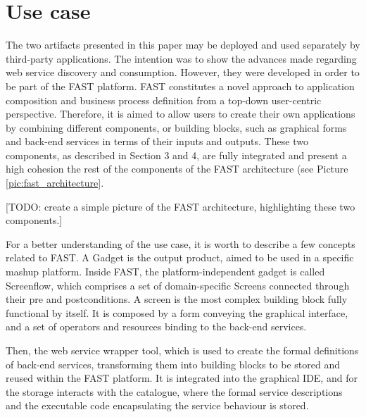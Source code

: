
\section{Use case}
\label{sec:use_case}

The two artifacts presented in this paper may be deployed and used separately by third-party applications. The intention was to show the advances made regarding web service discovery and consumption. However, they were developed in order to be part of the FAST platform. FAST constitutes a novel approach to application composition and business process definition from a top-down user-centric perspective. Therefore, it is aimed to allow users to create their own applications by combining different components, or building blocks, such as graphical forms and back-end services in terms of their inputs and outputs. These two components, as described in Section 3 and 4, are fully integrated and present a high cohesion the rest of the components of the FAST architecture (see Picture \ref{pic:fast_architecture}. 

[TODO: create a simple picture of the FAST architecture, highlighting these two components.]

For a better understanding of the use case, it is worth to describe a few concepts related to FAST. A Gadget is the output product, aimed to be used in a specific mashup platform. Inside FAST, the platform-independent gadget is called Screenflow, which comprises a set of domain-specific Screens connected through their pre and postconditions. A screen is the most complex building block fully functional by itself. It is composed by a form conveying the graphical interface, and a set of operators and resources binding to the back-end services.

Then, the web service wrapper tool, which is used to create the formal definitions of back-end services, transforming them into building blocks to be stored and reused within the FAST platform. It is integrated into the graphical IDE, and for the storage interacts with the catalogue, where the formal service descriptions and the executable code encapsulating the service behaviour is stored.

